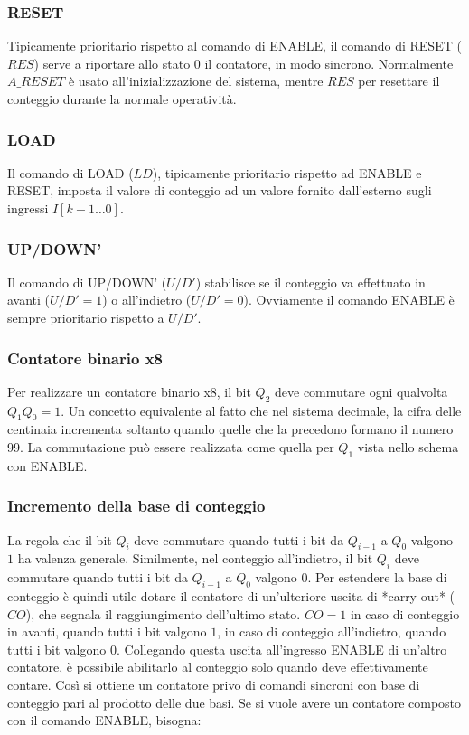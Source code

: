 \documentclass{article}
\begin{document}
\subsubsection{RESET}

Tipicamente prioritario rispetto al comando di ENABLE, il comando di RESET ($RES$) serve a riportare allo stato 0 il contatore, in modo sincrono.
Normalmente $A\_RESET$ è usato all'inizializzazione del sistema, mentre $RES$ per resettare il conteggio durante la normale operatività.

\subsubsection{LOAD}

Il comando di LOAD ($LD$), tipicamente prioritario rispetto ad ENABLE e RESET, imposta il valore di conteggio ad un valore fornito dall'esterno sugli ingressi $I[k-1 \dots 0]$.

\subsubsection{UP/DOWN'}

Il comando di UP/DOWN' ($U/D'$) stabilisce se il conteggio va effettuato in avanti ($U/D'=1$) o all'indietro ($U/D'=0$).
Ovviamente il comando ENABLE è sempre prioritario rispetto a $U/D'$.

\subsubsection{Contatore binario x8}

Per realizzare un contatore binario x8, il bit $Q_2$ deve commutare ogni qualvolta $Q_1Q_0 = 1$.
Un concetto equivalente al fatto che nel sistema decimale, la cifra delle centinaia incrementa soltanto quando quelle che la precedono formano il numero 99.
La commutazione può essere realizzata come quella per $Q_1$ vista nello schema con ENABLE.

\subsubsection{Incremento della base di conteggio}

La regola che il bit $Q_i$ deve commutare quando tutti i bit da $Q_{i-1}$ a $Q_0$ valgono $1$ ha valenza generale.
Similmente, nel conteggio all'indietro, il bit $Q_i$ deve commutare quando tutti i bit da $Q_{i-1}$ a $Q_0$ valgono $0$.
Per estendere la base di conteggio è quindi utile dotare il contatore di un'ulteriore uscita di *carry out* ($CO$), che segnala il raggiungimento dell'ultimo stato.
$CO=1$ in caso di conteggio in avanti, quando tutti i bit valgono $1$, in caso di conteggio all'indietro, quando tutti i bit valgono $0$.
Collegando questa uscita all'ingresso ENABLE di un'altro contatore, è possibile abilitarlo al conteggio solo quando deve effettivamente contare.
Così si ottiene un contatore privo di comandi sincroni con base di conteggio pari al prodotto delle due basi.
Se si vuole avere un contatore composto con il comando ENABLE, bisogna:
\end{document}
